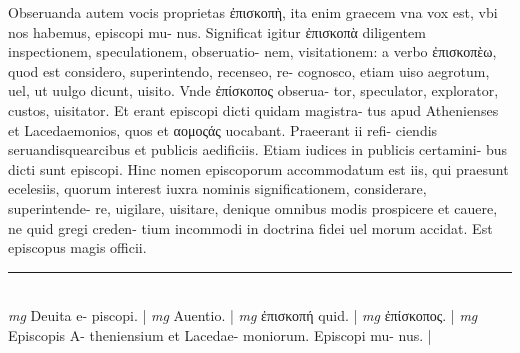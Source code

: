 \documentclass{article}
\begin{document}
\begin{pages}
Obseruanda autem vocis proprietas ἐπισκοπὴ, ita enim graecem vna vox est, vbi nos habemus, episcopi mu- nus. Significat igitur ἐπισκοπὰ diligentem inspectionem, speculationem, obseruatio- nem, visitationem: a verbo ἐπισκοπὲω, quod est considero, superintendo, recenseo, re- cognosco, etiam uiso aegrotum, uel, ut uulgo dicunt, uisito. Vnde ἐπίσκοπος obserua- tor, speculator, explorator, custos, uisitator. Et erant episcopi dicti quidam magistra- tus apud Athenienses et Lacedaemonios, quos et αομοςάς uocabant. Praeerant ii refi- ciendis seruandisquearcibus et publicis aedificiis. Etiam iudices in publicis certamini- bus dicti sunt episcopi. Hinc nomen episcoporum accommodatum est iis, qui praesunt ecelesiis, quorum interest iuxra nominis significationem, considerare, superintende- re, uigilare, uisitare, denique  omnibus modis prospicere et cauere, ne quid gregi creden- tium incommodi in doctrina fidei uel morum accidat. Est episcopus magis officii.  \pend
\vspace{0.5cm}\noindent
\vspace{0.2cm}\rule{1cm}{0.2pt}\\ 
\hspace{0.2cm}\textit{mg}
\footnotesize Deuita e- piscopi. 
\normalsize| 
\hspace{0.2cm}\textit{mg}
\footnotesize Auentio. 
\normalsize| 
\hspace{0.2cm}\textit{mg}
\footnotesize ἐπισκοπή quid. 
\normalsize| 
\hspace{0.2cm}\textit{mg}
\footnotesize ἐπίσκοπος. 
\normalsize| 
\hspace{0.2cm}\textit{mg}
\footnotesize Episcopis A- theniensium et Lacedae- moniorum. Episcopi mu- nus. 
\normalsize| 

\end{pages}
\end{document}

